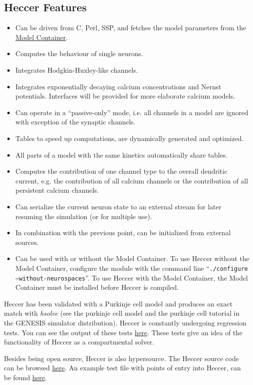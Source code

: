 \documentclass[12pt]{article}
\begin{document}
\subsection*{Heccer Features}

\begin{itemize}

\item Can be driven from C, Perl, SSP, and fetches the model parameters from the \href{../model-container/model-container.tex}{Model Container}.
\item Computes the behaviour of single neurons.
\item Integrates Hodgkin-Huxley-like channels.
\item Integrates exponentially decaying calcium concentrations and Nernst potentials. Interfaces will be provided for more elaborate calcium models.
\item Can operate in a ``passive-only'' mode, i.e. all channels in a model are ignored with exception of the synaptic channels.
\item Tables to speed up computations, are dynamically generated and optimized.
\item All parts of a model with the same kinetics automatically share tables.
\item Computes the contribution of one channel type to the overall dendritic current, e.g. the contribution of all calcium channels or the contribution of all persistent calcium channels.
\item Can serialize the current neuron state to an external stream for later resuming the simulation (or for multiple use).
\item In combination with the previous point, can be initialized from external sources.
\item Can be used with or without the Model Container. To use Heccer without the Model Container, configure the module with the command line ``{\tt ./configure --without-neurospaces}''. To use Heccer with the Model Container, the Model Container must be installed before Heccer is compiled. 
\end{itemize}
Heccer has been validated with a Purkinje cell model and produces an exact match with {\it hsolve} (see the purkinje cell model and the purkinje cell tutorial in the GENESIS simulator distribution). Heccer is constantly undergoing regression tests. You can see the output of these tests \href{}{here}. These tests give an idea of the functionality of Heccer as a compartmental solver.

Besides being open source, Heccer is also hypersource. The Heccer source code can be browsed \href{}{here}. An example test file with points of entry into Heccer, can be found \href{}{here}.
 
\end{document}
